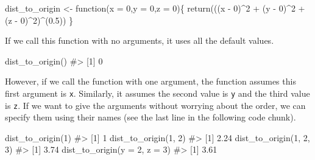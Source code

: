 \documentclass[
  letterpaper,
]{latex/krantz}
\makeatletter
\newenvironment{Shaded}{\begin{snugshade}}{\end{snugshade}}
\newcommand{\AttributeTok}[1]{\textcolor[rgb]{0.40,0.45,0.13}{#1}}
\newcommand{\CommentTok}[1]{\textcolor[rgb]{0.37,0.37,0.37}{#1}}
\newcommand{\ControlFlowTok}[1]{\textcolor[rgb]{0.00,0.23,0.31}{#1}}
\newcommand{\DecValTok}[1]{\textcolor[rgb]{0.68,0.00,0.00}{#1}}
\newcommand{\FloatTok}[1]{\textcolor[rgb]{0.68,0.00,0.00}{#1}}
\newcommand{\FunctionTok}[1]{\textcolor[rgb]{0.28,0.35,0.67}{#1}}
\newcommand{\NormalTok}[1]{\textcolor[rgb]{0.00,0.23,0.31}{#1}}
\newcommand{\OtherTok}[1]{\textcolor[rgb]{0.00,0.23,0.31}{#1}}
\newcommand{\SpecialCharTok}[1]{\textcolor[rgb]{0.37,0.37,0.37}{#1}}
\newenvironment{kframe}{%
\medskip{}
\setlength{\fboxsep}{.8em}
 \def\at@end@of@kframe{}%
 \ifinner\ifhmode%
  \def\at@end@of@kframe{\end{minipage}}%
  \begin{minipage}{\columnwidth}%
 \fi\fi%
 \def\FrameCommand##1{\hskip\@totalleftmargin \hskip-\fboxsep
 \colorbox{shadecolor}{##1}\hskip-\fboxsep
     \hskip-\linewidth \hskip-\@totalleftmargin \hskip\columnwidth}%
 \MakeFramed {\advance\hsize-\width
   \@totalleftmargin\z@ \linewidth\hsize
   \@setminipage}}%
 {\par\unskip\endMakeFramed%
 \at@end@of@kframe}
\renewenvironment{Shaded}{\begin{kframe}}{\end{kframe}}
\makeatother
\begin{document}
\begin{Shaded}
\begin{Highlighting}[]
\NormalTok{dist\_to\_origin }\OtherTok{\textless{}{-}} \ControlFlowTok{function}\NormalTok{(}\AttributeTok{x =} \DecValTok{0}\NormalTok{,}\AttributeTok{y =} \DecValTok{0}\NormalTok{,}\AttributeTok{z =} \DecValTok{0}\NormalTok{)\{}
  \FunctionTok{return}\NormalTok{(((x }\SpecialCharTok{{-}} \DecValTok{0}\NormalTok{)}\SpecialCharTok{\^{}}\DecValTok{2} \SpecialCharTok{+}\NormalTok{ (y }\SpecialCharTok{{-}} \DecValTok{0}\NormalTok{)}\SpecialCharTok{\^{}}\DecValTok{2} \SpecialCharTok{+}\NormalTok{ (z }\SpecialCharTok{{-}} \DecValTok{0}\NormalTok{)}\SpecialCharTok{\^{}}\DecValTok{2}\NormalTok{)}\SpecialCharTok{\^{}}\NormalTok{(}\FloatTok{0.5}\NormalTok{))}
\NormalTok{\}}
\end{Highlighting}
\end{Shaded}

If we call this function with no arguments, it uses all the default
values.

\begin{Shaded}
\begin{Highlighting}[]
\FunctionTok{dist\_to\_origin}\NormalTok{()}
\CommentTok{\#\textgreater{} [1] 0}
\end{Highlighting}
\end{Shaded}

However, if we call the function with one argument, the function assumes
this first argument is \texttt{x}. Similarly, it assumes the second
value is \texttt{y} and the third value is \texttt{z}. If we want to
give the arguments without worrying about the order, we can specify them
using their names (see the last line in the following code chunk).

\begin{Shaded}
\begin{Highlighting}[]
\FunctionTok{dist\_to\_origin}\NormalTok{(}\DecValTok{1}\NormalTok{)}
\CommentTok{\#\textgreater{} [1] 1}
\FunctionTok{dist\_to\_origin}\NormalTok{(}\DecValTok{1}\NormalTok{, }\DecValTok{2}\NormalTok{)}
\CommentTok{\#\textgreater{} [1] 2.24}
\FunctionTok{dist\_to\_origin}\NormalTok{(}\DecValTok{1}\NormalTok{, }\DecValTok{2}\NormalTok{, }\DecValTok{3}\NormalTok{)}
\CommentTok{\#\textgreater{} [1] 3.74}
\FunctionTok{dist\_to\_origin}\NormalTok{(}\AttributeTok{y =} \DecValTok{2}\NormalTok{, }\AttributeTok{z =} \DecValTok{3}\NormalTok{)}
\CommentTok{\#\textgreater{} [1] 3.61}
\end{Highlighting}
\end{Shaded}
\end{document}
